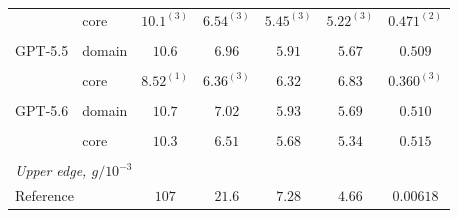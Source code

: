 \begin{table}[H]
\begin{tabular}{ll*{5}{c}}
 & core & \cellcolor{llpC}$10.1^{(3)}$ & \cellcolor{llpC}$6.54^{(3)}$ & \cellcolor{llpC}$5.45^{(3)}$ & \cellcolor{llpC}$5.22^{(3)}$ & \cellcolor{llpB}$0.471^{(2)}$ \\
& & \cellcolor{llpC}{\scriptsize$[9.37,\,17.4]$} & \cellcolor{llpC}{\color{llpSpread}{\scriptsize$[6.14,\,12.8]$}} & \cellcolor{llpC}{\color{llpSpread}{\scriptsize$[5.14,\,11.2]$}} & \cellcolor{llpC}{\color{llpSpread}{\scriptsize$[4.89,\,10.7]$}} & \cellcolor{llpB}{\scriptsize$[0.438,\,0.505]$} \\[2pt]
GPT-5.5 & domain & \cellcolor{llpC}$10.6$ & \cellcolor{llpC}$6.96$ & \cellcolor{llpC}$5.91$ & \cellcolor{llpC}$5.67$ & \cellcolor{llpA}$0.509$ \\
& & \cellcolor{llpC}{\scriptsize$[10.6,\,10.7]$} & \cellcolor{llpC}{\scriptsize$[6.94,\,7.09]$} & \cellcolor{llpC}{\scriptsize$[5.86,\,5.91]$} & \cellcolor{llpC}{\scriptsize$[5.63,\,5.68]$} & \cellcolor{llpA}{\scriptsize$[0.508,\,0.511]$} \\[2pt]
 & core & \cellcolor{llpA}$8.52^{(1)}$ & \cellcolor{llpC}$6.36^{(3)}$ & \cellcolor{llpD}$6.32$ & \cellcolor{llpD}$6.83$ & \cellcolor{llpD}$0.360^{(3)}$ \\
& & \cellcolor{llpA} & \cellcolor{llpC}{\scriptsize$[5.63,\,11.3]$} & \cellcolor{llpD}{\color{llpSpread}{\scriptsize$[4.43,\,12.4]$}} & \cellcolor{llpD}{\color{llpSpread}{\scriptsize$[4.07,\,10.6]$}} & \cellcolor{llpD}{\color{llpSpread}{\scriptsize$[0.265,\,0.685]$}} \\[2pt]
GPT-5.6 & domain & \cellcolor{llpC}$10.7$ & \cellcolor{llpC}$7.02$ & \cellcolor{llpC}$5.93$ & \cellcolor{llpC}$5.69$ & \cellcolor{llpA}$0.510$ \\
& & \cellcolor{llpC}{\scriptsize$[10.6,\,10.7]$} & \cellcolor{llpC}{\scriptsize$[6.97,\,7.08]$} & \cellcolor{llpC}{\scriptsize$[5.91,\,5.94]$} & \cellcolor{llpC}{\scriptsize$[5.66,\,5.70]$} & \cellcolor{llpA}{\scriptsize$[0.507,\,0.514]$} \\[2pt]
 & core & \cellcolor{llpC}$10.3$ & \cellcolor{llpC}$6.51$ & \cellcolor{llpC}$5.68$ & \cellcolor{llpC}$5.34$ & \cellcolor{llpA}$0.515$ \\
& & \cellcolor{llpC}{\scriptsize$[9.49,\,15.6]$} & \cellcolor{llpC}{\scriptsize$[6.08,\,10.9]$} & \cellcolor{llpC}{\scriptsize$[5.05,\,9.47]$} & \cellcolor{llpC}{\scriptsize$[4.81,\,9.04]$} & \cellcolor{llpA}{\scriptsize$[0.425,\,0.692]$} \\
\midrule
\multicolumn{7}{l}{\textit{Upper edge, $g/10^{-3}$}} \\
\midrule
\multicolumn{2}{l}{Reference} & $107$ & $21.6$ & $7.28$ & $4.66$ & $0.00618$ \\[2pt]

\end{tabular}
\end{table}
